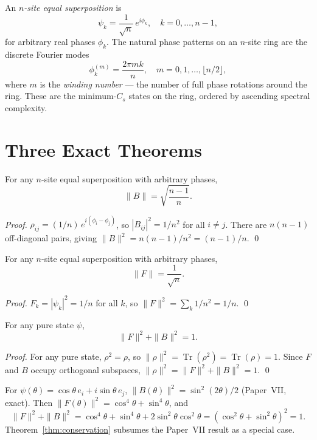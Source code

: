 \documentclass[11pt]{article}
\begin{document}
An \emph{$n$-site equal superposition} is
\[
  \psi_k = \frac{1}{\sqrt{n}}\,e^{i\phi_k}, \quad k = 0,\ldots,n-1,
\]
for arbitrary real phases $\phi_k$.
The natural phase patterns on an $n$-site ring are the discrete
Fourier modes
\[
  \phi_k^{(m)} = \frac{2\pi mk}{n},
  \quad m = 0, 1, \ldots, \lfloor n/2 \rfloor,
\]
where $m$ is the \emph{winding number} --- the number of full phase
rotations around the ring.
These are the minimum-$C_s$ states on the ring, ordered by ascending
spectral complexity.

\section{Three Exact Theorems}
\label{sec:theorems}

\begin{theorem}
\label{thm:boson}
For any $n$-site equal superposition with arbitrary phases,
\[
  \|B\| = \sqrt{\frac{n-1}{n}}.
\]
\end{theorem}

\begin{proof}
$\rho_{ij} = (1/n)\,e^{i(\phi_i-\phi_j)}$, so
$|B_{ij}|^2 = 1/n^2$ for all $i \neq j$.
There are $n(n-1)$ off-diagonal pairs, giving
$\|B\|^2 = n(n-1)/n^2 = (n-1)/n$. \qed
\end{proof}

\begin{theorem}
\label{thm:fermion}
For any $n$-site equal superposition with arbitrary phases,
\[
  \|F\| = \frac{1}{\sqrt{n}}.
\]
\end{theorem}

\begin{proof}
$F_k = |\psi_k|^2 = 1/n$ for all $k$,
so $\|F\|^2 = \sum_k 1/n^2 = 1/n$. \qed
\end{proof}

\begin{theorem}
\label{thm:conservation}
For any pure state $\psi$,
\[
  \|F\|^2 + \|B\|^2 = 1.
\]
\end{theorem}

\begin{proof}
For any pure state, $\rho^2 = \rho$, so
$\|\rho\|^2 = \operatorname{Tr}(\rho^2) = \operatorname{Tr}(\rho) = 1$.
Since $F$ and $B$ occupy orthogonal subspaces,
$\|\rho\|^2 = \|F\|^2 + \|B\|^2 = 1$. \qed
\end{proof}

\begin{remark}
For $\psi(\theta) = \cos\theta\,e_i + i\sin\theta\,e_j$,
$\|B(\theta)\|^2 = \sin^2(2\theta)/2$ (Paper~VII, exact).
Then $\|F(\theta)\|^2 = \cos^4\theta + \sin^4\theta$, and
\[
  \|F\|^2 + \|B\|^2
  = \cos^4\theta + \sin^4\theta + 2\sin^2\theta\cos^2\theta
  = (\cos^2\theta + \sin^2\theta)^2 = 1.
\]
Theorem~\ref{thm:conservation} subsumes the Paper~VII result as a
special case.
\end{remark}
\end{document}
